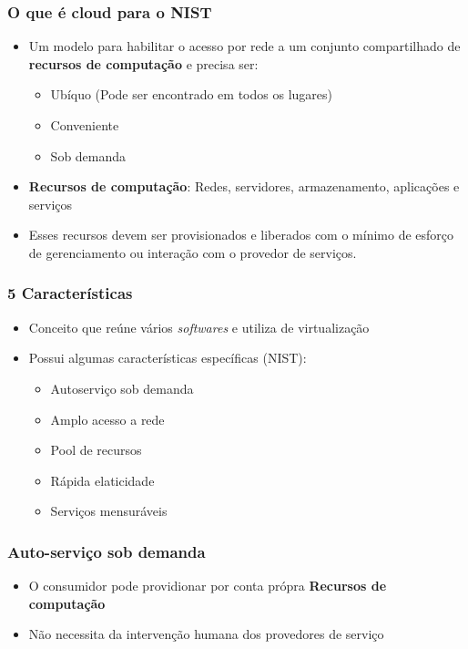 \begin{frame}
	\frametitle{O que é cloud para o NIST}
	\begin{itemize}
		\item Um modelo para habilitar o acesso por rede a um conjunto compartilhado de \textbf{recursos de computação} e precisa ser:
			\begin{itemize}
				\item Ubíquo (Pode ser encontrado em todos os lugares)
				\item Conveniente
				\item Sob demanda
			\end{itemize}
		\item \textbf{Recursos de computação}: Redes, servidores, armazenamento, aplicações e serviços
		\item Esses recursos devem ser provisionados e liberados com o mínimo de esforço de gerenciamento ou interação com o provedor de serviços.
	\end{itemize}
\end{frame}

\begin{frame}
	\frametitle{5 Características}
	\begin{itemize}
		\item Conceito que reúne vários \textit{softwares} e utiliza de virtualização
		\item Possui algumas características específicas (NIST):
			\begin{itemize}
				\item Autoserviço sob demanda
				\item Amplo acesso a rede
				\item Pool de recursos
				\item Rápida elaticidade
				\item Serviços mensuráveis
			\end{itemize}
	\end{itemize}
\end{frame}

\begin{frame}
	\frametitle{Auto-serviço sob demanda}
	\begin{itemize}
		\item O consumidor pode providionar por conta própra \textbf{Recursos de computação}
		\item Não necessita da intervenção humana dos provedores de serviço
	\end{itemize}
\end{frame}

